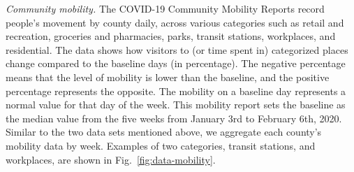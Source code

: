 \documentclass[journal]{IEEEtran}
\begin{document}

\vspace{.05in}
\noindent\emph{Community mobility.}
The COVID-19 Community Mobility Reports \cite{Covidcommunity2020} 
record people's movement by county daily, across various categories such as retail and recreation, groceries and pharmacies, parks, transit stations, workplaces, and residential. The data shows how visitors to (or time spent in) categorized places change compared to the baseline days (in percentage). The negative percentage means that the level of mobility is lower than the baseline, and the positive percentage represents the opposite. The mobility on a baseline day represents a normal value for that day of the week. This mobility report sets the baseline as the median value from the five weeks from January 3rd to February 6th, 2020. 
Similar to the two data sets mentioned above, we aggregate each county's mobility data by week. 
Examples of two categories, transit stations, and workplaces, are shown in Fig.~\ref{fig:data-mobility}.
\end{document}
